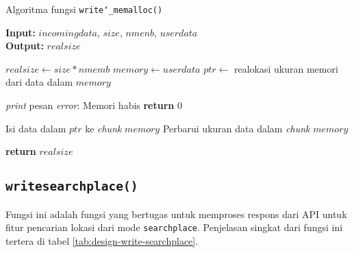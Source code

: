 \begin{algorithm}[h]
	\caption{Algoritma fungsi \texttt{write\char`_memalloc()}}
	\label{alg:design-write-memalloc}
	\vspace{-0.6\baselineskip}
	\begin{flushleft}
		\textbf{Input:} $incomingdata$, $size$, $nmenb$, $userdata$ \\
		\textbf{Output:} $realsize$ \\
	\end{flushleft}
	\vspace{-1.05\baselineskip}
	\begin{algorithmic}
		\State $realsize \gets size * nmemb$  
		\State $memory \gets userdata$ 
		\State $ptr \gets$ realokasi ukuran memori dari data dalam $memory$
		
		 
			\State \textit{print} pesan \textit{error}: Memori habis
			\State \textbf{return} $0$ 
		\EndIf
		
		\State Isi data dalam $ptr$ ke \textit{chunk} $memory$
		\State Perbarui ukuran data dalam \textit{chunk} $memory$
		
		\State \textbf{return} $realsize$ 
	\end{algorithmic}
\end{algorithm}

\subsection{\texttt{write\textunderscore searchplace()}}
\label{sec:design-code-write-searchplace}

Fungsi ini adalah fungsi yang bertugas untuk memproses respons dari API untuk fitur pencarian lokasi dari mode \verb|searchplace|. Penjelasan singkat dari fungsi ini tertera di tabel \ref{tab:design-write-searchplace}.

